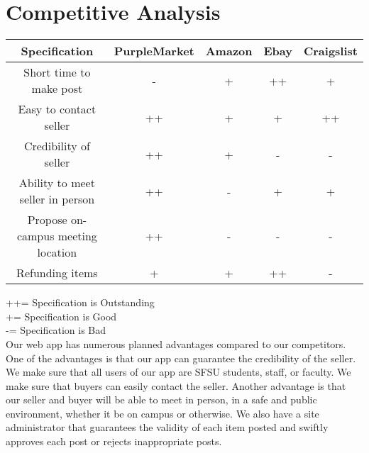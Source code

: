 \section{Competitive Analysis}

\begin{spacing}{1.25}
\begin{center}
\begin{tabular}{ | c | c | c | c | c | }
\hline
Specification 						& PurpleMarket 			& Amazon 				& Ebay 					& Craigslist\\\hline
Short time to make post 			& \cellcolor{red}-		& \cellcolor{yellow}+	& \cellcolor{green}++	& \cellcolor{yellow}+\\\hline
Easy to contact seller	 			& \cellcolor{green}++	& \cellcolor{yellow}+	& \cellcolor{yellow}+	& \cellcolor{green}++\\\hline
Credibility of seller	 			& \cellcolor{green}++	& \cellcolor{yellow}+	& \cellcolor{red}-		& \cellcolor{red}-\\\hline
Ability to meet seller in person	& \cellcolor{green}++	& \cellcolor{red}-		& \cellcolor{yellow}+	& \cellcolor{yellow}+\\\hline
Propose on-campus meeting location 	& \cellcolor{green}++	& \cellcolor{red}-		& \cellcolor{red}-		& \cellcolor{red}-\\\hline
Refunding items					 	& \cellcolor{yellow}+	& \cellcolor{yellow}+	& \cellcolor{green}++	& \cellcolor{red}-\\\hline
\end{tabular}
\end{center}
\tabto{18mm}++\tabto{25mm}= Specification is Outstanding\\
\tabto{18mm}+\tabto{25mm}= Specification is Good\\
\tabto{18mm}-\tabto{25mm}= Specification is Bad\\

Our web app has numerous planned advantages compared to our competitors. One of the advantages is that our app can guarantee the credibility of the seller. We make sure that all users of our app are SFSU students, staff, or faculty. We make sure that buyers can easily contact the seller. Another advantage is that our seller and buyer will be able to meet in person, in a safe and public environment, whether it be on campus or otherwise. We also have a site administrator that guarantees the validity of each item posted and swiftly approves each post or rejects inappropriate posts.
\end{spacing}